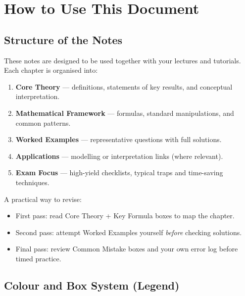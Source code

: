 \documentclass[12pt]{article}
\begin{document}
\newpage
\tableofcontents


\fontsize{10.5pt}{11.5pt}\selectfont
\pagestyle{main}


\section*{How to Use This Document}

\subsection*{Structure of the Notes}

These notes are designed to be used together with your lectures and tutorials. Each chapter is organised into:

\begin{enumerate}
    \item \textbf{Core Theory} — definitions, statements of key results, and conceptual interpretation.
    \item \textbf{Mathematical Framework} — formulas, standard manipulations, and common patterns.
    \item \textbf{Worked Examples} — representative questions with full solutions.
    \item \textbf{Applications} — modelling or interpretation links (where relevant).
    \item \textbf{Exam Focus} — high-yield checklists, typical traps and time-saving techniques.
\end{enumerate}

A practical way to revise:
\begin{itemize}
    \item First pass: read Core Theory + Key Formula boxes to map the chapter.
    \item Second pass: attempt Worked Examples yourself \emph{before} checking solutions.
    \item Final pass: review Common Mistake boxes and your own error log before timed practice.
\end{itemize}

\subsection*{Colour and Box System (Legend)}
\end{document}
